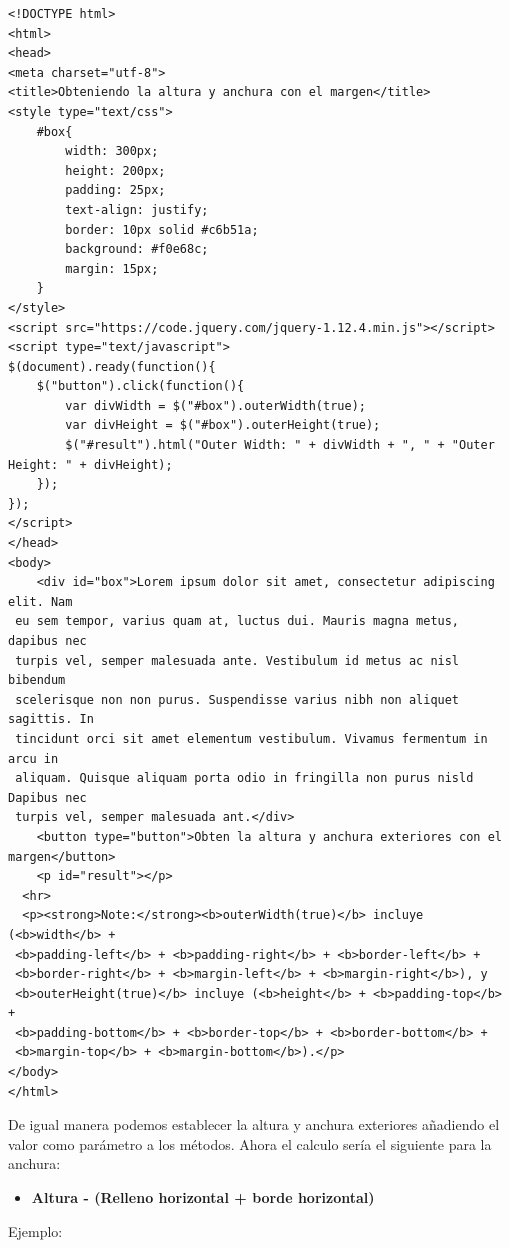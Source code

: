 \documentclass[a4paper, oneside]{article}
\begin{document}
\begin{verbatim}
<!DOCTYPE html>
<html>
<head>
<meta charset="utf-8">
<title>Obteniendo la altura y anchura con el margen</title>
<style type="text/css">
    #box{
        width: 300px;
        height: 200px;
        padding: 25px;
        text-align: justify;
        border: 10px solid #c6b51a;
        background: #f0e68c;
        margin: 15px;
    }        
</style>
<script src="https://code.jquery.com/jquery-1.12.4.min.js"></script>
<script type="text/javascript">
$(document).ready(function(){
    $("button").click(function(){
        var divWidth = $("#box").outerWidth(true);
        var divHeight = $("#box").outerHeight(true);
        $("#result").html("Outer Width: " + divWidth + ", " + "Outer Height: " + divHeight);
    });
});
</script>
</head>
<body>
    <div id="box">Lorem ipsum dolor sit amet, consectetur adipiscing elit. Nam
 eu sem tempor, varius quam at, luctus dui. Mauris magna metus, dapibus nec
 turpis vel, semper malesuada ante. Vestibulum id metus ac nisl bibendum
 scelerisque non non purus. Suspendisse varius nibh non aliquet sagittis. In
 tincidunt orci sit amet elementum vestibulum. Vivamus fermentum in arcu in
 aliquam. Quisque aliquam porta odio in fringilla non purus nisld Dapibus nec
 turpis vel, semper malesuada ant.</div>
    <button type="button">Obten la altura y anchura exteriores con el margen</button>
    <p id="result"></p>
  <hr>
  <p><strong>Note:</strong><b>outerWidth(true)</b> incluye (<b>width</b> +
 <b>padding-left</b> + <b>padding-right</b> + <b>border-left</b> +
 <b>border-right</b> + <b>margin-left</b> + <b>margin-right</b>), y
 <b>outerHeight(true)</b> incluye (<b>height</b> + <b>padding-top</b> +
 <b>padding-bottom</b> + <b>border-top</b> + <b>border-bottom</b> +
 <b>margin-top</b> + <b>margin-bottom</b>).</p>
</body>
</html>                                		
\end{verbatim}

De igual manera podemos establecer la altura y anchura exteriores añadiendo el valor como parámetro a los métodos. Ahora el calculo sería el siguiente para la anchura: 

\begin{itemize}
\item \textbf{Altura - (Relleno horizontal + borde horizontal)}
\end{itemize}

Ejemplo:
\end{document}
